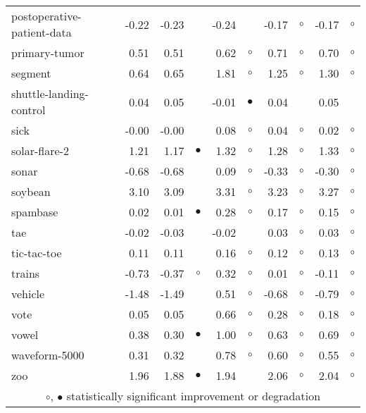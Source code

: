 \begin{table}[thb]
{\begin{tabular}{lrr@{\hspace{0.1cm}}cr@{\hspace{0.1cm}}cr@{\hspace{0.1cm}}cr@{\hspace{0.1cm}}c}
postoperative-patient-data & -0.22 & -0.23 &           & -0.24 &           & -0.17 &   $\circ$ & -0.17 &   $\circ$\\
primary-tumor &  0.51 &  0.51 &           &  0.62 &   $\circ$ &  0.71 &   $\circ$ &  0.70 &   $\circ$\\
segment &  0.64 &  0.65 &           &  1.81 &   $\circ$ &  1.25 &   $\circ$ &  1.30 &   $\circ$\\
shuttle-landing-control &  0.04 &  0.05 &           & -0.01 & $\bullet$ &  0.04 &           &  0.05 &          \\
sick & -0.00 & -0.00 &           &  0.08 &   $\circ$ &  0.04 &   $\circ$ &  0.02 &   $\circ$\\
solar-flare-2 &  1.21 &  1.17 & $\bullet$ &  1.32 &   $\circ$ &  1.28 &   $\circ$ &  1.33 &   $\circ$\\
sonar & -0.68 & -0.68 &           &  0.09 &   $\circ$ & -0.33 &   $\circ$ & -0.30 &   $\circ$\\
soybean &  3.10 &  3.09 &           &  3.31 &   $\circ$ &  3.23 &   $\circ$ &  3.27 &   $\circ$\\
spambase &  0.02 &  0.01 & $\bullet$ &  0.28 &   $\circ$ &  0.17 &   $\circ$ &  0.15 &   $\circ$\\
tae & -0.02 & -0.03 &           & -0.02 &           &  0.03 &   $\circ$ &  0.03 &   $\circ$\\
tic-tac-toe &  0.11 &  0.11 &           &  0.16 &   $\circ$ &  0.12 &   $\circ$ &  0.13 &   $\circ$\\
trains & -0.73 & -0.37 &   $\circ$ &  0.32 &   $\circ$ &  0.01 &   $\circ$ & -0.11 &   $\circ$\\
vehicle & -1.48 & -1.49 &           &  0.51 &   $\circ$ & -0.68 &   $\circ$ & -0.79 &   $\circ$\\
vote &  0.05 &  0.05 &           &  0.66 &   $\circ$ &  0.28 &   $\circ$ &  0.18 &   $\circ$\\
vowel &  0.38 &  0.30 & $\bullet$ &  1.00 &   $\circ$ &  0.63 &   $\circ$ &  0.69 &   $\circ$\\
waveform-5000 &  0.31 &  0.32 &           &  0.78 &   $\circ$ &  0.60 &   $\circ$ &  0.55 &   $\circ$\\
zoo &  1.96 &  1.88 & $\bullet$ &  1.94 &           &  2.06 &   $\circ$ &  2.04 &   $\circ$\\
\hline
\multicolumn{10}{c}{$\circ$, $\bullet$ statistically significant improvement or degradation}\\
\end{tabular} \footnotesize \par}
\end{table}